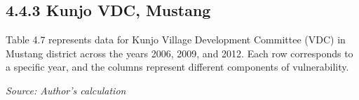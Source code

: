 \documentclass[12pt, a4paper]{article}
\begin{document}
\subsection*{4.4.3 Kunjo VDC, Mustang}
Table 4.7 represents data for Kunjo Village Development Committee (VDC) in Mustang district across the years 2006, 2009, and 2012. Each row corresponds to a specific year, and the columns represent different components of vulnerability.
\begin{table}[ht]
	\captionsetup{labelformat=empty}
		\caption{Table 4.7: Mean of the HVI components for Kunjo VDC, Mustang}
		\label{tab:hvikunjocomponents}
\textit{Source: Author's calculation}
\end{table}
\end{document}
